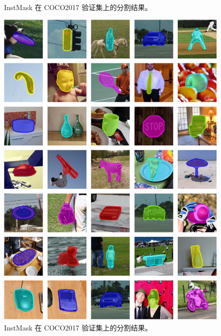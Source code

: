 \begin{figure}
                       \hspace{-0.6em}
    \caption{InstMask 在 COCO2017 \cite{COCO} 验证集上的分割结果。}
    \label{fig:InstMask}
\end{figure}
\fi

\begin{figure}
\centering
\includegraphics[width=1.0\textwidth]{Img/IGCF/coco.pdf}
\caption{InstMask 在 COCO2017 \cite{COCO} 验证集上的分割结果。}
\end{figure}

